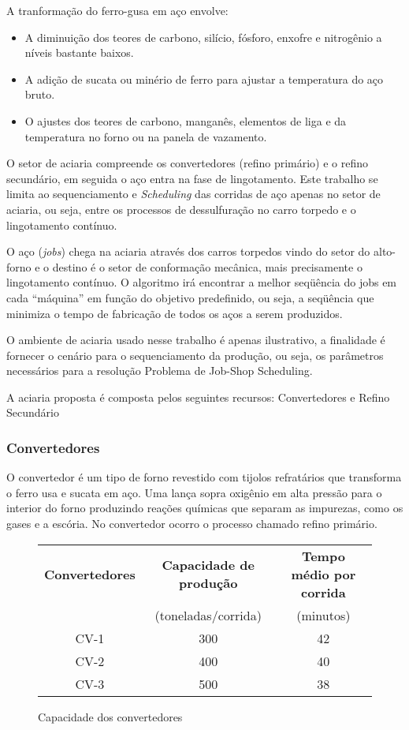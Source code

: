 A tranformação do ferro-gusa em aço envolve:
\begin{itemize}
\item A diminuição dos teores de carbono, silício, fósforo, enxofre e nitrogênio a níveis bastante baixos.
\item A adição de sucata ou minério de ferro para ajustar a temperatura do aço bruto.
\item O ajustes dos teores de carbono, manganês, elementos de liga e da temperatura no forno ou na panela de vazamento.
\end{itemize}

O setor de aciaria compreende os convertedores (refino primário) e o refino secundário, em seguida o aço entra na fase de lingotamento. Este trabalho se limita ao sequenciamento e {\it Scheduling} das corridas de aço apenas no setor de aciaria, ou seja, entre os processos de dessulfuração no carro torpedo e o lingotamento contínuo.

O aço ({\it jobs}) chega na aciaria através dos carros torpedos vindo do setor do alto-forno e o destino é o setor de conformação mecânica, mais precisamente o lingotamento contínuo. O algoritmo irá encontrar a melhor seqüência do jobs em cada “máquina” em função do objetivo predefinido, ou seja, a seqüência que minimiza o tempo de fabricação de
todos os aços a serem produzidos.

O ambiente de aciaria usado nesse trabalho é apenas ilustrativo, a finalidade é fornecer o cenário para o sequenciamento da produção, ou seja, os parâmetros necessários para a resolução Problema de Job-Shop Scheduling.

A aciaria proposta é composta pelos seguintes recursos: Convertedores e Refino Secundário

\subsubsection{Convertedores}
O convertedor é um tipo de forno revestido com tijolos refratários que transforma o ferro usa e sucata em aço. Uma lança sopra oxigênio em alta pressão para o interior do forno produzindo reações químicas que separam as impurezas, como os gases e a escória. No convertedor ocorro o processo chamado refino primário.

\begin{figure}[H]
\begin{center}
  \begin{tabular}{|c|c|c|}
    \hline
    {\bf Convertedores} & {\bf Capacidade de produção} & {\bf Tempo médio por corrida} \\
    $\quad$ & (toneladas/corrida)        &    (minutos) \\ \hline
    CV-1 & 300 & 42 \\ \hline
    CV-2 & 400 & 40 \\ \hline
    CV-3 & 500 & 38 \\
    \hline
  \end{tabular}
\end{center}
\caption{Capacidade dos convertedores}
\end{figure}

